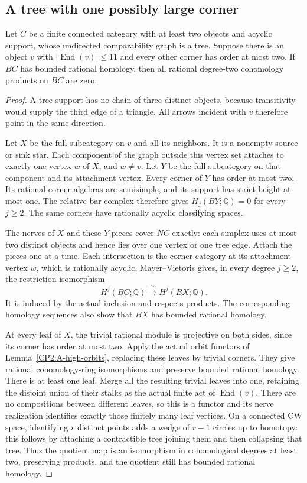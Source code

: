 \subsection{A tree with one possibly large corner}

\begin{proposition}
\label{CP2:A-tree-one-large-corner-eleven}
Let $C$ be a finite connected category with at least two objects and acyclic support,
whose undirected comparability graph is a tree. Suppose
there is an object $v$ with $|\operatorname{End}(v)|\leq11$
and every other corner has order at most two. If $BC$ has
bounded rational homology, then all rational degree-two
cohomology products on $BC$ are zero.
\end{proposition}
\begin{proof}
A tree support has no chain
of three distinct objects, because transitivity would supply
the third edge of a triangle. All arrows incident with $v$
therefore point in the same direction.

Let $X$ be the full subcategory on $v$ and all its neighbors.
It is a nonempty source or sink star. Each component of
the graph outside this vertex set attaches to exactly one
vertex $w$ of $X$, and $w\ne v$. Let $Y$ be the full
subcategory on that component and its attachment vertex.
Every corner of $Y$ has order at most two. Its rational
corner algebras are semisimple, and its support has strict
height at most one. The relative bar complex therefore
gives $H_j(BY;\mathbb Q)=0$ for every $j\geq2$.
The same corners have rationally acyclic classifying spaces.

The nerves of $X$ and these $Y$ pieces cover $NC$ exactly:
each simplex uses at most two distinct objects and hence
lies over one vertex or one tree edge. Attach the pieces
one at a time. Each intersection is the corner category at
its attachment vertex $w$, which is rationally acyclic.
Mayer--Vietoris gives, in every degree $j\geq2$, the
restriction isomorphism
\[
 H^j(BC;\mathbb Q)\xrightarrow{\ \cong\ }H^j(BX;\mathbb Q).
\]
It is induced by the actual inclusion and respects products.
The corresponding homology sequences also show that $BX$
has bounded rational homology.

At every leaf of $X$, the trivial rational module is
projective on both sides, since its corner has order at
most two. Apply the actual orbit functors of
Lemma~\ref{CP2:A-high-orbits}, replacing these leaves by
trivial corners. They give rational cohomology-ring
isomorphisms and preserve bounded rational homology.
There is at least one leaf. Merge all the resulting trivial
leaves into one, retaining the disjoint union of their
stalks as the actual finite act of $\operatorname{End}(v)$.
There are no compositions between different leaves, so this
is a functor and its nerve realization identifies exactly
those finitely many leaf vertices. On a connected CW space,
identifying $r$ distinct points adds a wedge of $r-1$ circles
up to homotopy: this follows by attaching a contractible
tree joining them and then collapsing that tree. Thus the
quotient map is an isomorphism in cohomological degrees at
least two, preserving products, and the quotient still has
bounded rational homology.


\end{proof}
